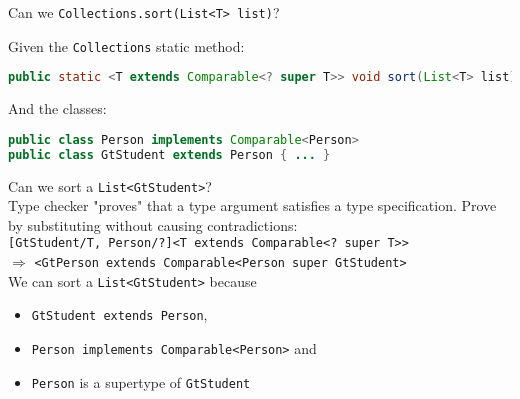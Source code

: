 \documentclass{beamer}
\begin{document}
\begin{frame}[fragile]{Can we {\tt Collections.sort(List<T> list)}?}

\vspace{-.05in}
Given the {\tt Collections} static method:
\begin{lstlisting}[language=Java]
public static <T extends Comparable<? super T>> void sort(List<T> list)
\end{lstlisting}
\vspace{-.05in}
And the classes:
\vspace{-.05in}
\begin{lstlisting}[language=Java]
public class Person implements Comparable<Person>
public class GtStudent extends Person { ... }
\end{lstlisting}
\vspace{-.05in}
Can we sort a {\tt List<GtStudent>}?\\
\vspace{.05in}
Type checker "proves" that a type argument satisfies a type specification.  Prove by substituting without causing contradictions:\\
\vspace{.05in}
\small
{\tt [GtStudent/T, Person/?]<T extends Comparable<? super T>>}\\
$\Rightarrow$ {\tt <GtPerson extends Comparable<Person super GtStudent>}
\normalsize
\\
\vspace{.05in}
We can sort a {\tt List<GtStudent>} because
\begin{itemize}
\item {\tt GtStudent extends Person},
\item {\tt Person implements Comparable<Person>} and
\item {\tt Person} is a supertype of {\tt GtStudent}
\end{itemize}

\end{frame}
\end{document}
